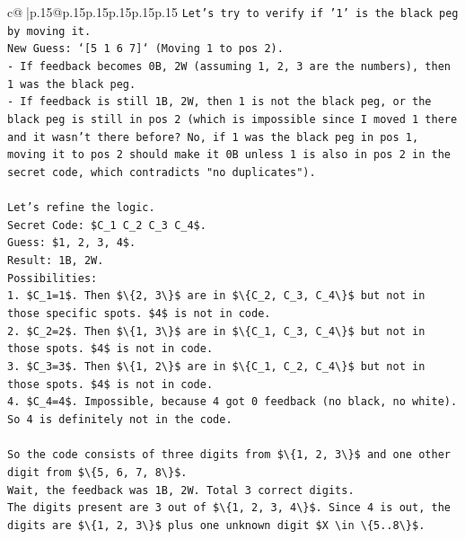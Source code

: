 \documentclass{article}
\begin{document}
{\begin{supertabular}{c@{$\;$}|p{.15\linewidth}@{}p{.15\linewidth}p{.15\linewidth}p{.15\linewidth}p{.15\linewidth}p{.15\linewidth}}
{{{\texttt{Let's try to verify if '1' is the black peg by moving it.} \\
\texttt{New Guess: `{[}5 1 6 7{]}` (Moving 1 to pos 2).} \\
\texttt{{-} If feedback becomes 0B, 2W (assuming 1, 2, 3 are the numbers), then 1 was the black peg.} \\
\texttt{{-} If feedback is still 1B, 2W, then 1 is not the black peg, or the black peg is still in pos 2 (which is impossible since I moved 1 there and it wasn't there before? No, if 1 was the black peg in pos 1, moving it to pos 2 should make it 0B unless 1 is also in pos 2 in the secret code, which contradicts "no duplicates").} \\
\\ 
\texttt{Let's refine the logic.} \\
\texttt{Secret Code: \$C\_1 C\_2 C\_3 C\_4\$.} \\
\texttt{Guess: \$1, 2, 3, 4\$.} \\
\texttt{Result: 1B, 2W.} \\
\texttt{Possibilities:} \\
\texttt{1. \$C\_1=1\$. Then \$\textbackslash{}\{2, 3\textbackslash{}\}\$ are in \$\textbackslash{}\{C\_2, C\_3, C\_4\textbackslash{}\}\$ but not in those specific spots. \$4\$ is not in code.} \\
\texttt{2. \$C\_2=2\$. Then \$\textbackslash{}\{1, 3\textbackslash{}\}\$ are in \$\textbackslash{}\{C\_1, C\_3, C\_4\textbackslash{}\}\$ but not in those spots. \$4\$ is not in code.} \\
\texttt{3. \$C\_3=3\$. Then \$\textbackslash{}\{1, 2\textbackslash{}\}\$ are in \$\textbackslash{}\{C\_1, C\_2, C\_4\textbackslash{}\}\$ but not in those spots. \$4\$ is not in code.} \\
\texttt{4. \$C\_4=4\$. Impossible, because 4 got 0 feedback (no black, no white). So 4 is definitely not in the code.} \\
\\ 
\texttt{So the code consists of three digits from \$\textbackslash{}\{1, 2, 3\textbackslash{}\}\$ and one other digit from \$\textbackslash{}\{5, 6, 7, 8\textbackslash{}\}\$.} \\
\texttt{Wait, the feedback was 1B, 2W. Total 3 correct digits.} \\
\texttt{The digits present are 3 out of \$\textbackslash{}\{1, 2, 3, 4\textbackslash{}\}\$. Since 4 is out, the digits are \$\textbackslash{}\{1, 2, 3\textbackslash{}\}\$ plus one unknown digit \$X \textbackslash{}in \textbackslash{}\{5..8\textbackslash{}\}\$.} \\
}}}
\end{supertabular}}
\end{document}
